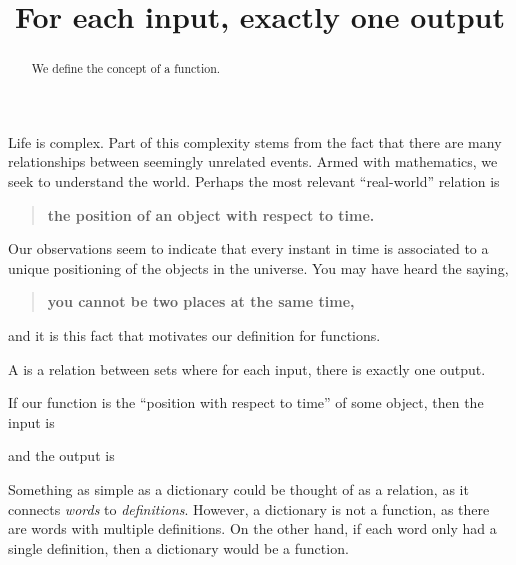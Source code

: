 \documentclass{ximera}
\title[Dig-In:]{For each input, exactly one output}
\begin{document}
\begin{abstract}
  We define the concept of a function.
\end{abstract}
\maketitle


Life is complex. Part of this complexity stems from the fact that
there are many relationships between seemingly unrelated events. Armed
with mathematics, we seek to understand the world.  Perhaps the most
relevant ``real-world'' relation is
\begin{quote}
  \textbf{the position of an object with respect to time.}
\end{quote}
Our observations seem to indicate that every instant in time is
associated to a unique positioning of the objects in the universe.  You
may have heard the saying,
\begin{quote}
  \textbf{you cannot be two places at the same time,}
\end{quote}
and it is this fact that motivates our definition for functions.

\begin{definition}
A  is a relation between sets where for each input,
there is exactly one output.
\end{definition}

\begin{question}
  If our function is the ``position with respect to time'' of some
  object, then the input is
  \begin{multipleChoice}
  \end{multipleChoice}
  and the output is
  \begin{multipleChoice}
  \end{multipleChoice}
\end{question}


Something as simple as a dictionary could be thought of as a relation,
as it connects \textit{words} to \textit{definitions}. However, a
dictionary is not a function, as there are words with multiple
definitions. On the other hand, if each word only had a single
definition, then a dictionary would be a function.
\end{document}
